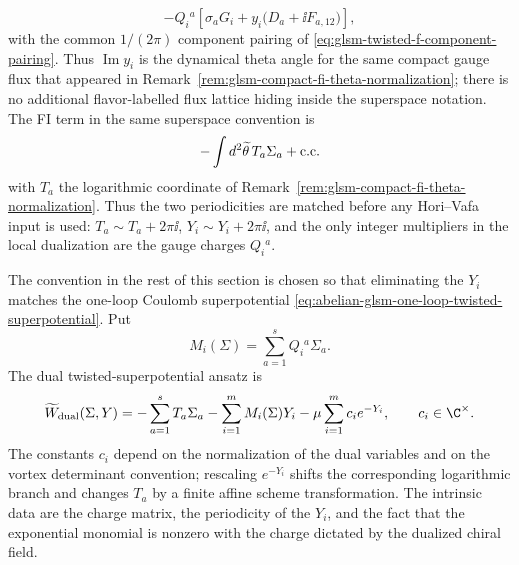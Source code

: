 \[
  -Q_i{}^a
  \left[
    \sigma_aG_i
    +y_i\bigl(D_a+\ii F_{a,12}\bigr)
  \right],
\]
with the common \(1/(2\pi)\) component pairing of
\eqref{eq:glsm-twisted-f-component-pairing}.  Thus
\(\operatorname{Im}y_i\) is the dynamical theta angle for the same compact
gauge flux that appeared in
Remark~\ref{rem:glsm-compact-fi-theta-normalization}; there is no additional
flavor-labelled flux lattice hiding inside the superspace notation.
The FI term in the same superspace convention is
\[
  -\int d^2\widetilde\theta\,T_a\Sigma_a+{\rm c.c.}
\]
with \(T_a\) the logarithmic coordinate of
Remark~\ref{rem:glsm-compact-fi-theta-normalization}.  Thus the two
periodicities are matched before any Hori--Vafa input is used:
\(T_a\sim T_a+2\pi\ii\), \(Y_i\sim Y_i+2\pi\ii\), and the only integer
multipliers in the local dualization are the gauge charges \(Q_i{}^a\).

The convention in the rest of this section is chosen so that eliminating the
\(Y_i\) matches the one-loop Coulomb superpotential
\eqref{eq:abelian-glsm-one-loop-twisted-superpotential}.  Put
\begin{equation}
  M_i(\Sigma)=\sum_{a=1}^s Q_i{}^a\Sigma_a .
  \label{eq:glsm-mirror-mass-linear-form}
\end{equation}
The dual twisted-superpotential ansatz is
\begin{equation}
  \widetilde W_{\rm dual}(\Sigma,Y)
  =
  -\sum_{a=1}^s T_a\Sigma_a
  -
  \sum_{i=1}^m M_i(\Sigma)Y_i
  -
  \mu\sum_{i=1}^m c_i e^{-Y_i},
  \qquad c_i\in\C^\times .
  \label{eq:glsm-hv-dual-twisted-superpotential}
\end{equation}
The constants \(c_i\) depend on the normalization of the dual variables and
on the vortex determinant convention; rescaling \(e^{-Y_i}\) shifts the
corresponding logarithmic branch and changes \(T_a\) by a finite affine
scheme transformation.  The intrinsic data are the charge matrix, the
periodicity of the \(Y_i\), and the fact that the exponential monomial is
nonzero with the charge dictated by the dualized chiral field.

